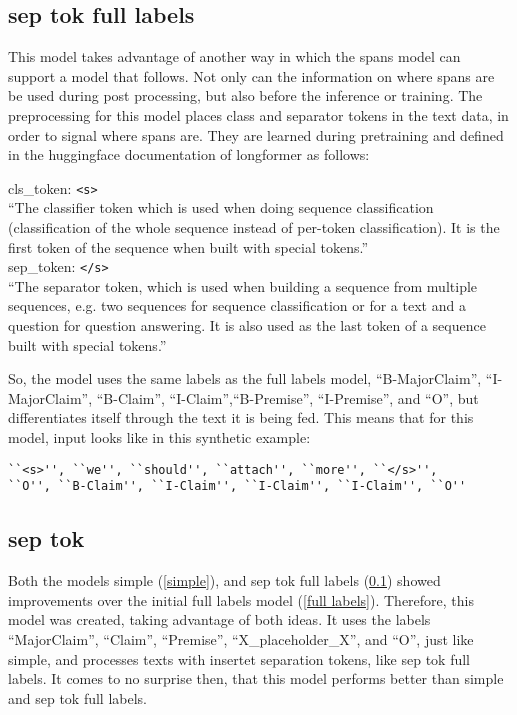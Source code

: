 \documentclass[12]{article}
\theoremstyle{mytheoremstyle}
\theoremstyle{mytheoremstyle}
\theoremstyle{myproblemstyle}
\begin{document}
  \subsection{sep tok full labels} \label{sep tok full labels}
  This model takes advantage of another way in which the spans model can support a model that follows. Not only can the information on where spans are be used during post processing, but also before the inference or training. The preprocessing for this model places class and separator tokens in the text data, in order to signal where spans are. They are learned during pretraining and defined in the huggingface documentation of longformer as follows:
  \vspace{1ex}
  \begin{adjustwidth}{0.5cm}{0.5cm}
  cls\_token: \verb|<s>|\\
    ``The classifier token which is used when doing sequence classification (classification of the whole sequence instead of per-token classification). It is the first token of the sequence when built with special tokens.'' \cite{LongformerTokenizer} \vspace{1ex}\\
  sep\_token: \verb|</s>|\\
  ``The separator token, which is used when building a sequence from multiple sequences, e.g. two sequences for sequence classification or for a text and a question for question answering. It is also used as the last token of a sequence built with special tokens.'' \cite{LongformerTokenizer}\vspace{-2ex}\\
  \end{adjustwidth}
  So, the model uses the same labels as the full labels model, ``B-MajorClaim'', ``I-MajorClaim'', ``B-Claim'', ``I-Claim'',``B-Premise'', ``I-Premise'', and ``O'', but differentiates itself through the text it is being fed. This means that for this model, input looks like in this synthetic example:
  \begin{verbatim}
``<s>'', ``we'', ``should'', ``attach'', ``more'', ``</s>'', 
``O'', ``B-Claim'', ``I-Claim'', ``I-Claim'', ``I-Claim'', ``O''
  \end{verbatim}
  \subsection{sep tok} \label{sep tok}
  Both the models simple (\ref{simple}), and sep tok full labels (\ref{sep tok full labels}) showed improvements over the initial full labels model (\ref{full labels}). Therefore, this model was created, taking advantage of both ideas. It uses the labels ``MajorClaim'', ``Claim'', ``Premise'', ``X\_placeholder\_X'', and ``O'', just like simple, and processes texts with insertet separation tokens, like sep tok full labels. It comes to no surprise then, that this model performs better than simple and sep tok full labels.
\end{document}
